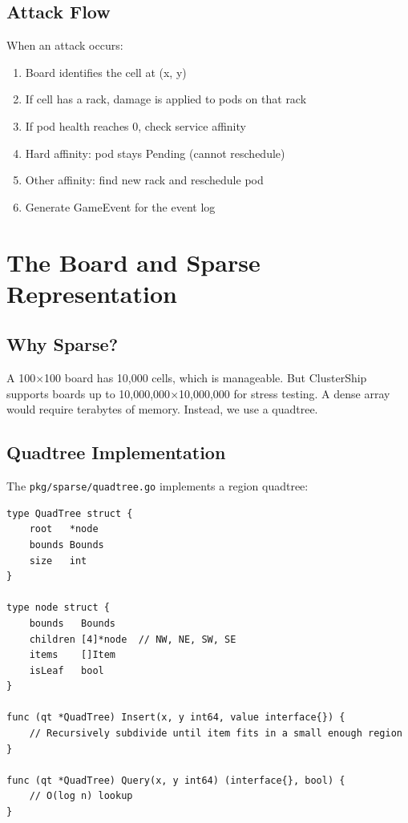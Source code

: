 \documentclass[11pt]{article}
\begin{document}
\subsection{Attack Flow}

When an attack occurs:
\begin{enumerate}
    \item Board identifies the cell at (x, y)
    \item If cell has a rack, damage is applied to pods on that rack
    \item If pod health reaches 0, check service affinity
    \item Hard affinity: pod stays Pending (cannot reschedule)
    \item Other affinity: find new rack and reschedule pod
    \item Generate GameEvent for the event log
\end{enumerate}


\section{The Board and Sparse Representation}


\subsection{Why Sparse?}

A 100$\times$100 board has 10,000 cells, which is manageable. But ClusterShip supports boards up to 10,000,000$\times$10,000,000 for stress testing. A dense array would require terabytes of memory. Instead, we use a quadtree.

\subsection{Quadtree Implementation}

The \texttt{pkg/sparse/quadtree.go} implements a region quadtree:

\begin{lstlisting}
type QuadTree struct {
    root   *node
    bounds Bounds
    size   int
}

type node struct {
    bounds   Bounds
    children [4]*node  // NW, NE, SW, SE
    items    []Item
    isLeaf   bool
}

func (qt *QuadTree) Insert(x, y int64, value interface{}) {
    // Recursively subdivide until item fits in a small enough region
}

func (qt *QuadTree) Query(x, y int64) (interface{}, bool) {
    // O(log n) lookup
}
\end{lstlisting}
\end{document}
